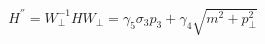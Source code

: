 \begin{equation}
H^{''} = W_{\perp}^{-1} H W_{\perp} = \gamma_{5} \sigma_{3} p_{3} +
\gamma_{4} \sqrt{ m^{2} + p_{\perp}^{2}} 
\end{equation}

